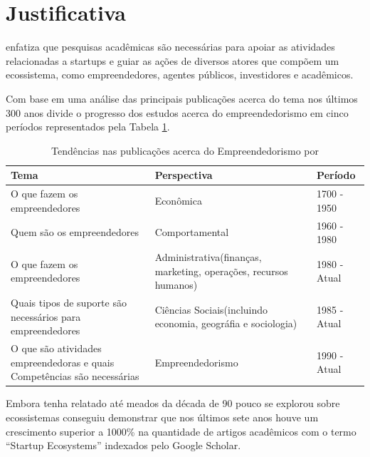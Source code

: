 \section{Justificativa}
\label{section:justificativa}

 enfatiza que pesquisas acadêmicas são necessárias para apoiar as atividades relacionadas a startups e guiar as ações de diversos atores que compõem um ecossistema, como empreendedores, agentes públicos, investidores e acadêmicos.

Com base em uma análise das principais publicações acerca do tema nos últimos 300 anos  divide o progresso dos estudos acerca do empreendedorismo em cinco períodos representados pela Tabela \ref{table:tendencias_nas_publicacoes_acerca_do_empreendedorismo}.

\begin{table}[!htb]
	\centering
	\begin{tabular}{ | p{6cm} | p{6cm} | p{3cm} | }
		\hline
		Tema & Perspectiva & Período \\ \hline
		O que fazem os empreendedores & Econômica & 1700 - 1950 \\ \hline
		Quem são os empreendedores & Comportamental & 1960 - 1980 \\ \hline
		O que fazem os empreendedores & Administrativa(finanças, marketing, operações, recursos humanos) & 1980 - Atual \\ \hline
		Quais tipos de suporte são necessários para empreendedores & Ciências Sociais(incluindo economia, geográfia e sociologia) & 1985 - Atual \\ \hline
		O que são atividades empreendedoras e quais Competências são necessárias & Empreendedorismo & 1990 - Atual \\ \hline
	\end{tabular}
	\caption{Tendências nas publicações acerca do Empreendedorismo por \cite{Filion1998}}
	\label{table:tendencias_nas_publicacoes_acerca_do_empreendedorismo}
\end{table}


Embora  tenha relatado até meados da década de 90 pouco se explorou sobre ecossistemas  conseguiu demonstrar que nos últimos sete anos houve um crescimento superior a 1000\% na quantidade de artigos acadêmicos com o termo ``Startup Ecosystems'' indexados pelo Google Scholar. 

